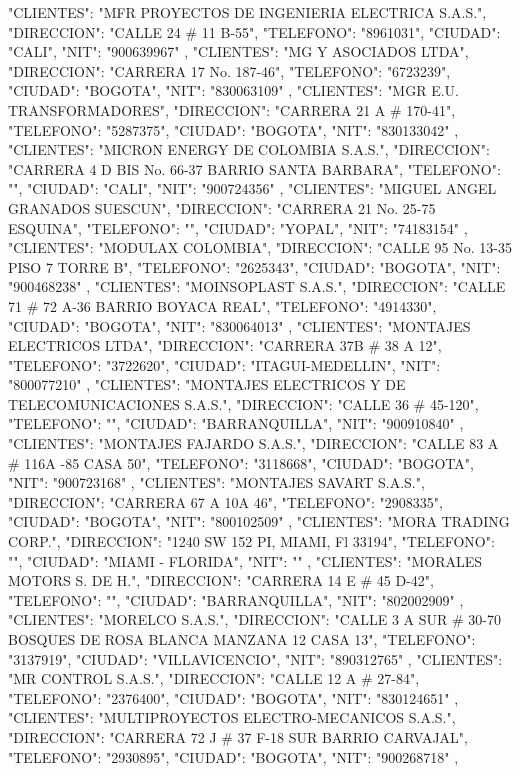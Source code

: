    {
   "CLIENTES": "MFR PROYECTOS DE INGENIERIA ELECTRICA S.A.S.",
   "DIRECCION": "CALLE 24 # 11 B-55",
   "TELEFONO": "8961031",
   "CIUDAD": "CALI",
   "NIT": "900639967"
   },
   {
   "CLIENTES": "MG Y ASOCIADOS LTDA",
   "DIRECCION": "CARRERA 17 No. 187-46",
   "TELEFONO": "6723239",
   "CIUDAD": "BOGOTA",
   "NIT": "830063109"
   },
   {
   "CLIENTES": "MGR E.U. TRANSFORMADORES",
   "DIRECCION": "CARRERA 21 A # 170-41",
   "TELEFONO": "5287375",
   "CIUDAD": "BOGOTA",
   "NIT": "830133042"
   },
   {
   "CLIENTES": "MICRON ENERGY DE COLOMBIA S.A.S.",
   "DIRECCION": "CARRERA 4 D BIS No. 66-37 BARRIO SANTA BARBARA",
   "TELEFONO": "",
   "CIUDAD": "CALI",
   "NIT": "900724356"
   },
   {
   "CLIENTES": "MIGUEL ANGEL GRANADOS SUESCUN",
   "DIRECCION": "CARRERA 21 No. 25-75 ESQUINA",
   "TELEFONO": "",
   "CIUDAD": "YOPAL",
   "NIT": "74183154"
   },
   {
   "CLIENTES": "MODULAX COLOMBIA",
   "DIRECCION": "CALLE 95 No. 13-35 PISO 7 TORRE B",
   "TELEFONO": "2625343",
   "CIUDAD": "BOGOTA",
   "NIT": "900468238"
   },
   {
   "CLIENTES": "MOINSOPLAST S.A.S.",
   "DIRECCION": "CALLE 71 # 72 A-36 BARRIO BOYACA REAL",
   "TELEFONO": "4914330",
   "CIUDAD": "BOGOTA",
   "NIT": "830064013"
   },
   {
   "CLIENTES": "MONTAJES ELECTRICOS LTDA",
   "DIRECCION": "CARRERA 37B # 38 A 12",
   "TELEFONO": "3722620",
   "CIUDAD": "ITAGUI-MEDELLIN",
   "NIT": "800077210"
   },
   {
   "CLIENTES": "MONTAJES ELECTRICOS Y DE TELECOMUNICACIONES S.A.S.",
   "DIRECCION": "CALLE 36 # 45-120",
   "TELEFONO": "",
   "CIUDAD": "BARRANQUILLA",
   "NIT": "900910840"
   },
   {
   "CLIENTES": "MONTAJES FAJARDO S.A.S.",
   "DIRECCION": "CALLE 83 A # 116A -85 CASA 50",
   "TELEFONO": "3118668",
   "CIUDAD": "BOGOTA",
   "NIT": "900723168"
   },
   {
   "CLIENTES": "MONTAJES SAVART S.A.S.",
   "DIRECCION": "CARRERA 67 A 10A 46",
   "TELEFONO": "2908335",
   "CIUDAD": "BOGOTA",
   "NIT": "800102509"
   },
   {
   "CLIENTES": "MORA TRADING CORP.",
   "DIRECCION": "1240 SW 152 PI, MIAMI, Fl 33194",
   "TELEFONO": "",
   "CIUDAD": "MIAMI - FLORIDA",
   "NIT": ""
   },
   {
   "CLIENTES": "MORALES MOTORS S. DE H.",
   "DIRECCION": "CARRERA 14 E # 45 D-42",
   "TELEFONO": "",
   "CIUDAD": "BARRANQUILLA",
   "NIT": "802002909"
   },
   {
   "CLIENTES": "MORELCO S.A.S.",
   "DIRECCION": "CALLE 3 A SUR # 30-70 BOSQUES DE ROSA BLANCA MANZANA 12 CASA 13",
   "TELEFONO": "3137919",
   "CIUDAD": "VILLAVICENCIO",
   "NIT": "890312765"
   },
   {
   "CLIENTES": "MR CONTROL S.A.S.",
   "DIRECCION": "CALLE 12 A # 27-84",
   "TELEFONO": "2376400",
   "CIUDAD": "BOGOTA",
   "NIT": "830124651"
   },
   {
   "CLIENTES": "MULTIPROYECTOS ELECTRO-MECANICOS S.A.S.",
   "DIRECCION": "CARRERA 72 J # 37 F-18 SUR BARRIO CARVAJAL",
   "TELEFONO": "2930895",
   "CIUDAD": "BOGOTA",
   "NIT": "900268718"
   },

